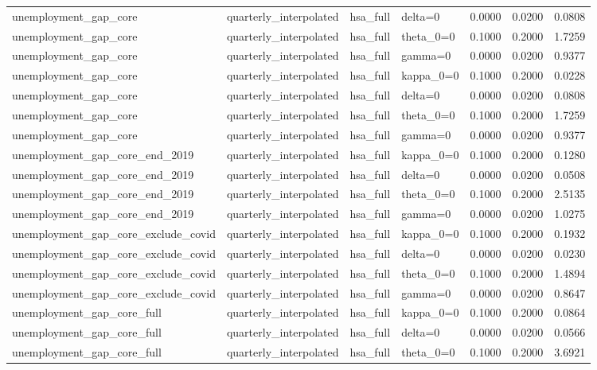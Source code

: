 \begin{tabular}{llllrrr}
unemployment\_gap\_core & quarterly\_interpolated & hsa\_full & delta=0 & 0.0000 & 0.0200 & 0.0808 \\
unemployment\_gap\_core & quarterly\_interpolated & hsa\_full & theta\_0=0 & 0.1000 & 0.2000 & 1.7259 \\
unemployment\_gap\_core & quarterly\_interpolated & hsa\_full & gamma=0 & 0.0000 & 0.0200 & 0.9377 \\
unemployment\_gap\_core & quarterly\_interpolated & hsa\_full & kappa\_0=0 & 0.1000 & 0.2000 & 0.0228 \\
unemployment\_gap\_core & quarterly\_interpolated & hsa\_full & delta=0 & 0.0000 & 0.0200 & 0.0808 \\
unemployment\_gap\_core & quarterly\_interpolated & hsa\_full & theta\_0=0 & 0.1000 & 0.2000 & 1.7259 \\
unemployment\_gap\_core & quarterly\_interpolated & hsa\_full & gamma=0 & 0.0000 & 0.0200 & 0.9377 \\
unemployment\_gap\_core\_end\_2019 & quarterly\_interpolated & hsa\_full & kappa\_0=0 & 0.1000 & 0.2000 & 0.1280 \\
unemployment\_gap\_core\_end\_2019 & quarterly\_interpolated & hsa\_full & delta=0 & 0.0000 & 0.0200 & 0.0508 \\
unemployment\_gap\_core\_end\_2019 & quarterly\_interpolated & hsa\_full & theta\_0=0 & 0.1000 & 0.2000 & 2.5135 \\
unemployment\_gap\_core\_end\_2019 & quarterly\_interpolated & hsa\_full & gamma=0 & 0.0000 & 0.0200 & 1.0275 \\
unemployment\_gap\_core\_exclude\_covid & quarterly\_interpolated & hsa\_full & kappa\_0=0 & 0.1000 & 0.2000 & 0.1932 \\
unemployment\_gap\_core\_exclude\_covid & quarterly\_interpolated & hsa\_full & delta=0 & 0.0000 & 0.0200 & 0.0230 \\
unemployment\_gap\_core\_exclude\_covid & quarterly\_interpolated & hsa\_full & theta\_0=0 & 0.1000 & 0.2000 & 1.4894 \\
unemployment\_gap\_core\_exclude\_covid & quarterly\_interpolated & hsa\_full & gamma=0 & 0.0000 & 0.0200 & 0.8647 \\
unemployment\_gap\_core\_full & quarterly\_interpolated & hsa\_full & kappa\_0=0 & 0.1000 & 0.2000 & 0.0864 \\
unemployment\_gap\_core\_full & quarterly\_interpolated & hsa\_full & delta=0 & 0.0000 & 0.0200 & 0.0566 \\
unemployment\_gap\_core\_full & quarterly\_interpolated & hsa\_full & theta\_0=0 & 0.1000 & 0.2000 & 3.6921 \\

\end{tabular}
